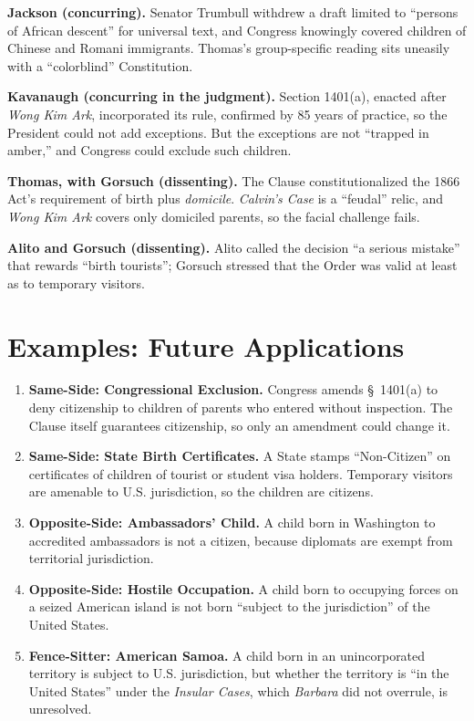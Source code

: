 \documentclass[12pt]{article}
\begin{document}
\textbf{Jackson (concurring).} Senator Trumbull withdrew a draft limited to ``persons of African descent'' for universal text, and Congress knowingly covered children of Chinese and Romani immigrants. Thomas's group-specific reading sits uneasily with a ``colorblind'' Constitution.

\textbf{Kavanaugh (concurring in the judgment).} Section 1401(a), enacted after \textit{Wong Kim Ark}, incorporated its rule, confirmed by 85 years of practice, so the President could not add exceptions. But the exceptions are not ``trapped in amber,'' and Congress could exclude such children.

\textbf{Thomas, with Gorsuch (dissenting).} The Clause constitutionalized the 1866 Act's requirement of birth plus \textit{domicile}. \textit{Calvin's Case} is a ``feudal'' relic, and \textit{Wong Kim Ark} covers only domiciled parents, so the facial challenge fails.

\textbf{Alito and Gorsuch (dissenting).} Alito called the decision ``a serious mistake'' that rewards ``birth tourists''; Gorsuch stressed that the Order was valid at least as to temporary visitors.

\section{Examples: Future Applications}

\begin{enumerate}
\item \textbf{Same-Side: Congressional Exclusion.} Congress amends \S\ 1401(a) to deny citizenship to children of parents who entered without inspection. The Clause itself guarantees citizenship, so only an amendment could change it.
\item \textbf{Same-Side: State Birth Certificates.} A State stamps ``Non-Citizen'' on certificates of children of tourist or student visa holders. Temporary visitors are amenable to U.S. jurisdiction, so the children are citizens.
\item \textbf{Opposite-Side: Ambassadors' Child.} A child born in Washington to accredited ambassadors is not a citizen, because diplomats are exempt from territorial jurisdiction.
\item \textbf{Opposite-Side: Hostile Occupation.} A child born to occupying forces on a seized American island is not born ``subject to the jurisdiction'' of the United States.
\item \textbf{Fence-Sitter: American Samoa.} A child born in an unincorporated territory is subject to U.S. jurisdiction, but whether the territory is ``in the United States'' under the \textit{Insular Cases}, which \textit{Barbara} did not overrule, is unresolved.
\end{enumerate}
\end{document}
